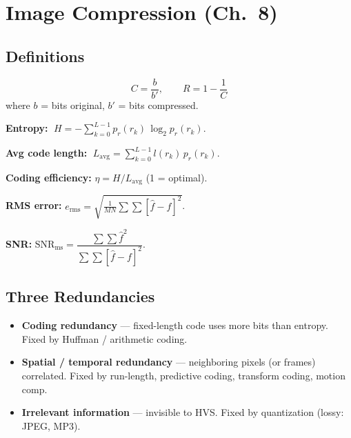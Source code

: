 \documentclass[10pt]{article}
\begin{document}
\section{Image Compression (Ch.~8)}

\subsection{Definitions}
\begin{tcolorbox}[studybox]
\[
C = \frac{b}{b'}, \qquad R = 1 - \frac{1}{C}
\]
where $b$ = bits original, $b'$ = bits compressed.
\smallskip

\textbf{Entropy:} $\;H = -\sum_{k=0}^{L-1} p_r(r_k)\,\log_2 p_r(r_k)$.

\textbf{Avg code length:} $\;L_{\text{avg}} = \sum_{k=0}^{L-1} l(r_k)\, p_r(r_k)$.

\textbf{Coding efficiency:} $\eta = H / L_{\text{avg}}$ (1 = optimal).

\textbf{RMS error:}
\(e_{\text{rms}} = \sqrt{\tfrac{1}{MN}\sum\sum [\hat{f}-f]^2}\).

\textbf{SNR:}
\(\text{SNR}_{\text{ms}} = \dfrac{\sum\sum \hat{f}^2}{\sum\sum [\hat{f}-f]^2}\).
\end{tcolorbox}

\subsection{Three Redundancies}
\begin{itemize}
  \item \textbf{Coding redundancy} — fixed-length code uses more bits than entropy. Fixed by Huffman / arithmetic coding.
  \item \textbf{Spatial / temporal redundancy} — neighboring pixels (or frames) correlated. Fixed by run-length, predictive coding, transform coding, motion comp.
  \item \textbf{Irrelevant information} — invisible to HVS. Fixed by quantization (lossy: JPEG, MP3).
\end{itemize}
\end{document}
